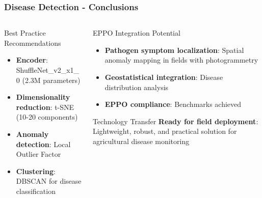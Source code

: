 \documentclass[aspectratio=43]{beamer}
\begin{document}
\begin{frame}
    \frametitle{\small Disease Detection - Conclusions}
    
    \begin{columns}
        \begin{column}{0.5\textwidth}
            
            \begin{exampleblock}{Best Practice Recommendations}
                \begin{itemize}
                    \item \textbf{Encoder}: ShuffleNet\_v2\_x1\_0 (2.3M parameters)
                    \item \textbf{Dimensionality reduction}: t-SNE (10-20 components)
                    \item \textbf{Anomaly detection}: Local Outlier Factor
                    \item \textbf{Clustering}: DBSCAN for disease classification
                \end{itemize}
            \end{exampleblock}
        \end{column}
        
        \begin{column}{0.5\textwidth}
            \begin{alertblock}{EPPO Integration Potential}
                \begin{itemize}
                    \item \textbf{Pathogen symptom localization}: Spatial anomaly mapping in fields with photogrammetry
                    \item \textbf{Geostatistical integration}: Disease distribution analysis
                    \item \textbf{EPPO compliance}: Benchmarks achieved
                \end{itemize}
            \end{alertblock}
            
            \begin{exampleblock}{Technology Transfer}
                \textbf{Ready for field deployment}: Lightweight, robust, and practical solution for agricultural disease monitoring
            \end{exampleblock}
        \end{column}
    \end{columns}
\end{frame}
\end{document}
